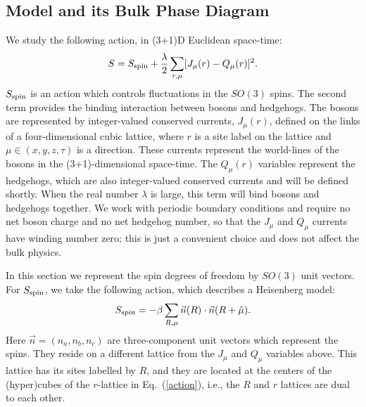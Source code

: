 \documentclass[prb,twocolumn]{revtex4-1}
\begin{document}
\subsection{Model and its Bulk Phase Diagram}
\label{subsec::bulkheis}
We study the following action, in (3+1)D Euclidean space-time:
\begin{equation}
S=S_{\rm spin}+\frac{\lambda}{2}\sum_{r,\mu} [ J_\mu(r)- Q_\mu(r)]^2.
\label{action}
\end{equation}
$S_{\rm spin}$ is an action which controls fluctuations in the $SO(3)$ spins. The second term provides the binding interaction between bosons and hedgehogs. The bosons are represented by integer-valued conserved currents, $J_\mu(r)$, defined on the links of a four-dimensional cubic lattice, where $r$ is a site label on the lattice and $\mu\in (x,y,z,\tau)$ is a direction. These currents represent the world-lines of the bosons in the (3+1)-dimensional space-time. The $Q_\mu(r)$ variables represent the hedgehogs, which are also integer-valued conserved currents and will be defined shortly.  When the real number $\lambda$ is large, this term will bind bosons and hedgehogs together. We work with periodic boundary conditions and require no net boson charge and no net hedgehog number, so that the $J_\mu$ and $Q_\mu$ currents have winding number zero; this is just a convenient choice and does not affect the bulk physics.

In this section we represent the spin degrees of freedom by $SO(3)$ unit vectors. For $S_{\rm spin}$, we take the following action, which describes a Heisenberg model:
\begin{equation}
S_{\rm spin}=-\beta\sum_{R,\mu} \vec{n}(R)\cdot \vec{n}(R+\hat{\mu}).
\label{SHeis}
\end{equation}
Here $\vec{n}=(n_a,n_b,n_c)$ are three-component unit vectors which represent the spins. They reside on a different lattice from the $J_\mu$ and $Q_\mu$ variables above. This lattice has its sites labelled by $R$, and they are located at the centers of the (hyper)cubes of the $r$-lattice in Eq.~(\ref{action}), i.e., the $R$ and $r$ lattices are dual to each other.  
\end{document}
